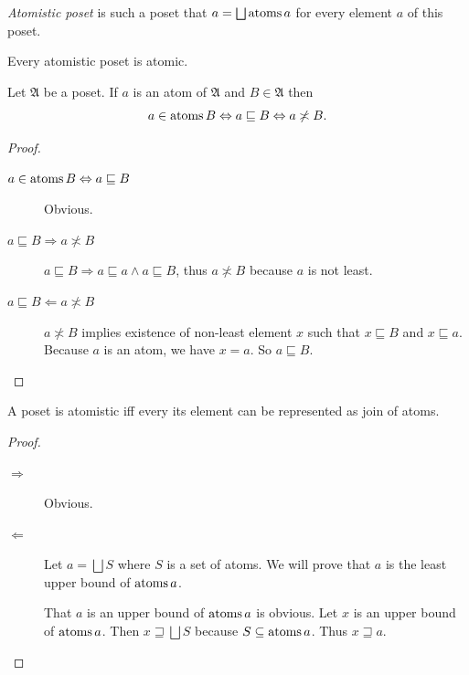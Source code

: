 \begin{defn}
\emph{Atomistic poset} is such a poset that $a=\bigsqcup\atoms a$
for every element $a$ of this poset.\end{defn}
\begin{obvious}
Every atomistic poset is atomic.\end{obvious}
\begin{prop}
Let $\mathfrak{A}$ be a poset. If $a$ is an atom of $\mathfrak{A}$
and $B\in\mathfrak{A}$ then 
\[
a\in\operatorname{atoms} B\Leftrightarrow a\sqsubseteq B\Leftrightarrow a\not\asymp B.
\]
\end{prop}
\begin{proof}
~
\begin{description}
\item [{$a\in\operatorname{atoms} B\Leftrightarrow a\sqsubseteq B$}] Obvious.
\item [{$a\sqsubseteq B\Rightarrow a\nasymp B$}] $a\sqsubseteq B\Rightarrow a\sqsubseteq a\land a\sqsubseteq B$,
thus $a\nasymp B$ because $a$ is not least.
\item [{$a\sqsubseteq B\Leftarrow a\nasymp B$}] $a\nasymp B$ implies
existence of non-least element $x$ such that $x\sqsubseteq B$ and
$x\sqsubseteq a$. Because $a$ is an atom, we have $x=a$. So $a\sqsubseteq B$.
\end{description}
\end{proof}
\begin{thm}
A poset is atomistic iff every its element can be represented as join of atoms.
\end{thm}
\begin{proof}
~
\begin{description}
\item[$\Rightarrow$] Obvious.
\item[$\Leftarrow$] Let $a = \bigsqcup S$ where $S$ is a set of atoms. We will prove that $a$ is
the least upper bound of $\operatorname{atoms} a$.

That $a$ is an upper bound of $\operatorname{atoms} a$ is obvious. Let $x$ is an upper
bound of $\operatorname{atoms} a$. Then $x \sqsupseteq \bigsqcup S$ because $S\subseteq \operatorname{atoms} a$. Thus $x \sqsupseteq a$.
\end{description}

\end{proof}

